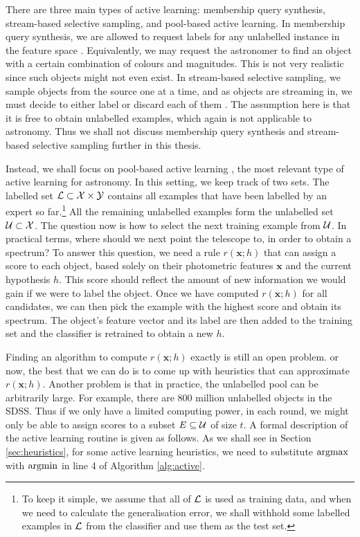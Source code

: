 There are three main types of active learning: membership query synthesis, stream-based selective
sampling, and pool-based active learning. In membership query synthesis, we are allowed to request
labels for any unlabelled instance in the feature space \cite{angluin88}. Equivalently, we may
request the astronomer to find an object with a certain combination of colours and magnitudes. This
is not very realistic since such objects might not even exist. In stream-based selective sampling,
we sample objects from the source one at a time, and as objects are streaming in, we must decide to
either label or discard each of them \cite{cohn94}. The assumption here is that it is free to obtain
unlabelled examples, which again is not applicable to astronomy. Thus we shall not discuss membership
query synthesis and stream-based selective sampling further in this thesis.

Instead, we shall focus on pool-based active learning \cite{lewis94}, the most relevant type of
active learning for astronomy. In this setting, we keep track of two sets. The labelled set
$\mathcal{L} \subset \mathcal{X} \times \mathcal{Y}$ contains all examples that have been labelled by an expert so
far.\footnote{To keep it simple, we assume that all of $\mathcal{L}$ is used as training data,
    and when we need to calculate the generalisation error, we shall withhold some labelled examples in
    $\mathcal{L}$ from the classifier and use them as the test set.} All the remaining unlabelled
examples form the unlabelled set $\mathcal{U} \subset \mathcal{X}$. The question now is how to select the
next training example from $\mathcal{U}$. In practical terms, where should we next point the
telescope to, in order to obtain a spectrum? To answer this question, we need a rule $r(\bm{x}; h)$
that can assign a score to each object, based solely on their photometric features $\bm{x}$ and the
current hypothesis $h$. This score should reflect the amount of new information we would gain if we
were to label the object. Once we have computed $r(\bm{x}; h)$ for all candidates, we can then pick
the example with the highest score and obtain its spectrum. The object's feature vector and its
label are then added to the training set and the classifier is retrained to obtain a new $h$.

Finding an algorithm to compute $r(\bm{x}; h)$ exactly is still an open problem. or now, the best
that we can do is to come up with heuristics that can approximate $r(\bm{x}; h)$. Another problem
is that in practice, the unlabelled pool can be arbitrarily large. For example, there are 800
million unlabelled objects in the SDSS. Thus if we only have a limited computing power, in each
round, we might only be able to assign scores to a subset $E \subseteq \mathcal{U}$ of size $t$. A
formal description of the active learning routine is given as follows. As we shall see in Section
\ref{sec:heuristics}, for some active learning heuristics, we need to substitute $\argmax$ with
$\argmin$ in line 4 of Algorithm \ref{alg:active}.

